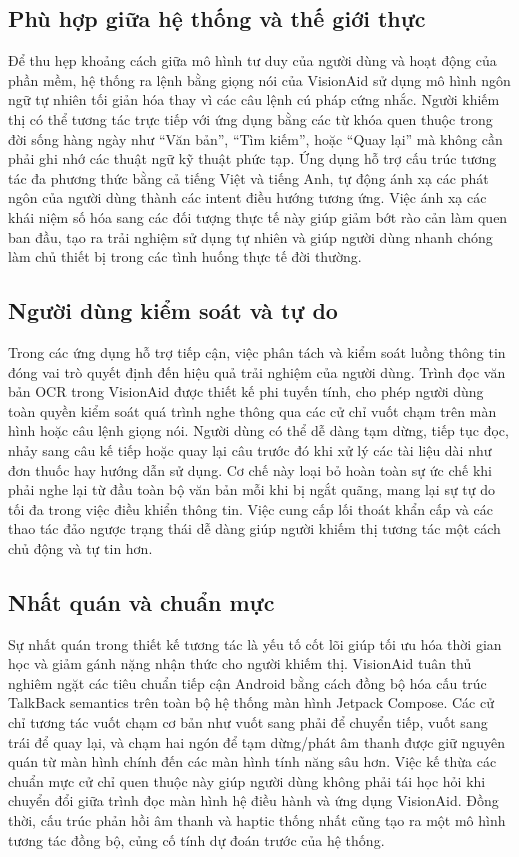 \documentclass[a4paper,13pt]{report}
\begin{document}
\subsection{Phù hợp giữa hệ thống và thế giới thực}

Để thu hẹp khoảng cách giữa mô hình tư duy của người dùng và hoạt động của phần mềm, hệ thống ra lệnh bằng giọng nói của VisionAid sử dụng mô hình ngôn ngữ tự nhiên tối giản hóa thay vì các câu lệnh cú pháp cứng nhắc. Người khiếm thị có thể tương tác trực tiếp với ứng dụng bằng các từ khóa quen thuộc trong đời sống hàng ngày như ``Văn bản'', ``Tìm kiếm'', hoặc ``Quay lại'' mà không cần phải ghi nhớ các thuật ngữ kỹ thuật phức tạp. Ứng dụng hỗ trợ cấu trúc tương tác đa phương thức bằng cả tiếng Việt và tiếng Anh, tự động ánh xạ các phát ngôn của người dùng thành các intent điều hướng tương ứng. Việc ánh xạ các khái niệm số hóa sang các đối tượng thực tế này giúp giảm bớt rào cản làm quen ban đầu, tạo ra trải nghiệm sử dụng tự nhiên và giúp người dùng nhanh chóng làm chủ thiết bị trong các tình huống thực tế đời thường.

\subsection{Người dùng kiểm soát và tự do}

Trong các ứng dụng hỗ trợ tiếp cận, việc phân tách và kiểm soát luồng thông tin đóng vai trò quyết định đến hiệu quả trải nghiệm của người dùng. Trình đọc văn bản OCR trong VisionAid được thiết kế phi tuyến tính, cho phép người dùng toàn quyền kiểm soát quá trình nghe thông qua các cử chỉ vuốt chạm trên màn hình hoặc câu lệnh giọng nói. Người dùng có thể dễ dàng tạm dừng, tiếp tục đọc, nhảy sang câu kế tiếp hoặc quay lại câu trước đó khi xử lý các tài liệu dài như đơn thuốc hay hướng dẫn sử dụng. Cơ chế này loại bỏ hoàn toàn sự ức chế khi phải nghe lại từ đầu toàn bộ văn bản mỗi khi bị ngắt quãng, mang lại sự tự do tối đa trong việc điều khiển thông tin. Việc cung cấp lối thoát khẩn cấp và các thao tác đảo ngược trạng thái dễ dàng giúp người khiếm thị tương tác một cách chủ động và tự tin hơn.

\subsection{Nhất quán và chuẩn mực}

Sự nhất quán trong thiết kế tương tác là yếu tố cốt lõi giúp tối ưu hóa thời gian học và giảm gánh nặng nhận thức cho người khiếm thị. VisionAid tuân thủ nghiêm ngặt các tiêu chuẩn tiếp cận Android bằng cách đồng bộ hóa cấu trúc TalkBack semantics trên toàn bộ hệ thống màn hình Jetpack Compose. Các cử chỉ tương tác vuốt chạm cơ bản như vuốt sang phải để chuyển tiếp, vuốt sang trái để quay lại, và chạm hai ngón để tạm dừng/phát âm thanh được giữ nguyên quán từ màn hình chính đến các màn hình tính năng sâu hơn. Việc kế thừa các chuẩn mực cử chỉ quen thuộc này giúp người dùng không phải tái học hỏi khi chuyển đổi giữa trình đọc màn hình hệ điều hành và ứng dụng VisionAid. Đồng thời, cấu trúc phản hồi âm thanh và haptic thống nhất cũng tạo ra một mô hình tương tác đồng bộ, củng cố tính dự đoán trước của hệ thống.
\end{document}
